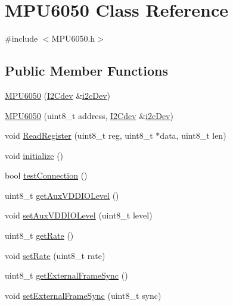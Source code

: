 \hypertarget{classMPU6050}{}\section{M\+P\+U6050 Class Reference}
\label{classMPU6050}


{\ttfamily \#include $<$M\+P\+U6050.\+h$>$}

\subsection*{Public Member Functions}
\begin{DoxyCompactItemize}
\item 
\mbox{\hyperlink{classMPU6050_a8ba282c0e5a9c0bc773d702ea5a83af1}{M\+P\+U6050}} (\mbox{\hyperlink{classI2Cdev}{I2\+Cdev}} \&\mbox{\hyperlink{classMPU6050_aae191481b6ec5841600b572b37861fe3}{i2c\+Dev}})
\item 
\mbox{\hyperlink{classMPU6050_a9d3322e6f83e4642d01cd0e878bdabf0}{M\+P\+U6050}} (uint8\+\_\+t address, \mbox{\hyperlink{classI2Cdev}{I2\+Cdev}} \&\mbox{\hyperlink{classMPU6050_aae191481b6ec5841600b572b37861fe3}{i2c\+Dev}})
\item 
void \mbox{\hyperlink{classMPU6050_a2eb8b486f4890c100f07f354ef7703fb}{Read\+Register}} (uint8\+\_\+t reg, uint8\+\_\+t $\ast$data, uint8\+\_\+t len)
\item 
void \mbox{\hyperlink{classMPU6050_abd8fc6c18adf158011118fbccc7e7054}{initialize}} ()
\item 
bool \mbox{\hyperlink{classMPU6050_a95ffab7b44fce3834236e0813687d11a}{test\+Connection}} ()
\item 
uint8\+\_\+t \mbox{\hyperlink{classMPU6050_af6e9af8e2222889fd5458e2ae12c55c8}{get\+Aux\+V\+D\+D\+I\+O\+Level}} ()
\item 
void \mbox{\hyperlink{classMPU6050_a7c666c20e26869bc80646f1b2c3d69bc}{set\+Aux\+V\+D\+D\+I\+O\+Level}} (uint8\+\_\+t level)
\item 
uint8\+\_\+t \mbox{\hyperlink{classMPU6050_a887a173e079980505763ffd1aa9fec05}{get\+Rate}} ()
\item 
void \mbox{\hyperlink{classMPU6050_a7d03801d6b656e8e12cd3c1dd97824a8}{set\+Rate}} (uint8\+\_\+t rate)
\item 
uint8\+\_\+t \mbox{\hyperlink{classMPU6050_a902a7d486cd6ac21f8c378634dc6f59a}{get\+External\+Frame\+Sync}} ()
\item 
void \mbox{\hyperlink{classMPU6050_a77b36f41c531a11b5a835fc75a9aefe6}{set\+External\+Frame\+Sync}} (uint8\+\_\+t sync)
\item 

\end{DoxyCompactItemize}
